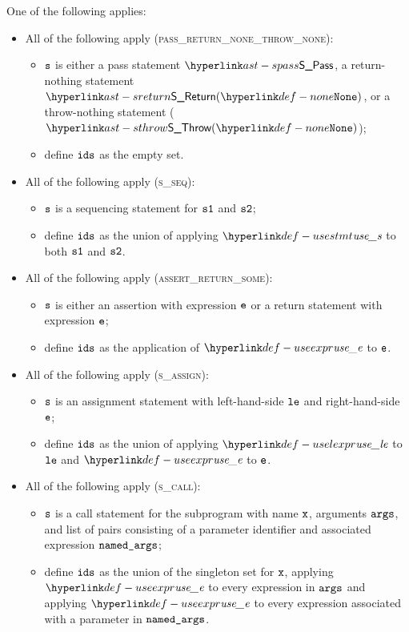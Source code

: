 \ProseParagraph
One of the following applies:
\begin{itemize}
  \item All of the following apply (\textsc{pass\_return\_none\_throw\_none}):
  \begin{itemize}
    \item $\texttt{s}$ is either a pass statement $\SPass$, a return-nothing statement $\SReturn(\None)$,
          or a throw-nothing statement ($\SThrow(\None)$);
    \item define $\texttt{ids}$ as the empty set.
  \end{itemize}

  \item All of the following apply (\textsc{s\_seq}):
  \begin{itemize}
    \item $\texttt{s}$ is a sequencing statement for $\texttt{s1}$ and $\texttt{s2}$;
    \item define $\texttt{ids}$ as the union of applying $\usestmt$ to both $\texttt{s1}$ and $\texttt{s2}$.
  \end{itemize}

  \item All of the following apply (\textsc{assert\_return\_some}):
  \begin{itemize}
    \item $\texttt{s}$ is either an assertion with expression $\texttt{e}$ or a return statement with expression $\texttt{e}$;
    \item define $\texttt{ids}$ as the application of $\useexpr$ to $\texttt{e}$.
  \end{itemize}

  \item All of the following apply (\textsc{s\_assign}):
  \begin{itemize}
    \item $\texttt{s}$ is an assignment statement with left-hand-side $\texttt{le}$ and right-hand-side $\texttt{e}$;
    \item define $\texttt{ids}$ as the union of applying $\uselexpr$ to $\texttt{le}$ and $\useexpr$ to $\texttt{e}$.
  \end{itemize}

  \item All of the following apply (\textsc{s\_call}):
  \begin{itemize}
    \item $\texttt{s}$ is a call statement for the subprogram with name $\texttt{x}$, arguments $\texttt{args}$, and list of
          pairs consisting of a parameter identifier and associated expression $\texttt{named\_args}$;
    \item define $\texttt{ids}$ as the union of the singleton set for $\texttt{x}$, applying $\useexpr$ to
          every expression in $\texttt{args}$ and applying $\useexpr$ to every expression associated with
          a parameter in $\texttt{named\_args}$.
  \end{itemize}


\end{itemize}
